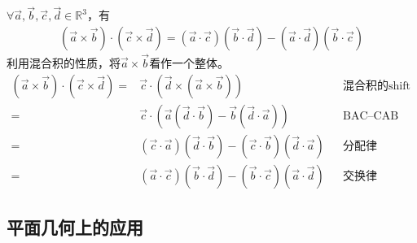 \begin{example}
  $\forall \vec a,\vec b,\vec c,\vec d\in\mathbb{R}^3$，有
  \begin{align*}
    (\vec a\times \vec b) \cdot (\vec c\times \vec d) =
    (\vec a\cdot \vec c)(\vec b\cdot \vec d) - (\vec a\cdot \vec d)(\vec b\cdot \vec c)
  \end{align*}
  利用混合积的性质，将$\vec a\times\vec b$看作一个整体。
  \begin{align*}
    (\vec a\times \vec b) \cdot (\vec c\times \vec d) ={}&
    \vec c \cdot (\vec d\times (\vec a\times \vec b)) &&\text{混合积的shift property}\\
    ={}& \vec c\cdot( \vec a(\vec d\cdot\vec b) -\vec b(\vec d\cdot\vec a) ) && \text{BAC--CAB rule}\\
    ={}& (\vec c\cdot\vec a)(\vec d\cdot\vec b) - (\vec c\cdot\vec b)(\vec d\cdot\vec a) &&\text{分配律}\\
    ={}& (\vec a\cdot\vec c)(\vec b\cdot\vec d) - (\vec b\cdot\vec c)(\vec a\cdot\vec d) &&\text{交换律}
  \end{align*}
\end{example}

\subsection{平面几何上的应用}
\label{sec:application-on-geometry-of-vector}

